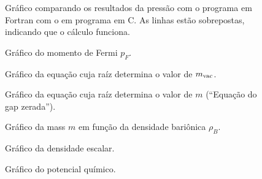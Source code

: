 \begin{figure}
	
	\caption{Gráfico comparando os resultados da pressão com o programa em Fortran com o em programa em C. As linhas estão sobrepostas, indicando que o cálculo funciona. \protect}
	\label{Fig:pressure_Comp_C_F}
\end{figure}

\FloatBarrier


\begin{figure}
	
	\caption{Gráfico do momento de Fermi $p_F$. \protect}
	\label{Fig:fermi_momentum_NJL-Buballa_Set_1}
\end{figure}

\begin{figure}
	
	\caption{Gráfico da equação cuja raíz determina o valor de $m_{\rm{vac}}$. \protect}
	\label{Fig:vacuum_mass_equation_NJL-Buballa_Set_1}
\end{figure}

\begin{figure}
	
	\caption{Gráfico da equação cuja raíz determina o valor de $m$ (``Equação do gap zerada''). \protect}
	\label{Fig:gap_NJL-Buballa_Set_1}
\end{figure}

\begin{figure}
	
	\caption{Gráfico da mass $m$ em função da densidade bariônica $\rho_B$. \protect}
	\label{Fig:mass_NJL-Buballa_Set_1}
\end{figure}


\begin{figure}
	
	\caption{Gráfico da densidade escalar. \protect}
	\label{Fig:scalar_density_NJL-Buballa_Set_1}
\end{figure}

\begin{figure}
	
	\caption{Gráfico do potencial químico. \protect}
	\label{Fig:chemical_potential_NJL-Buballa_Set_1}
\end{figure}

